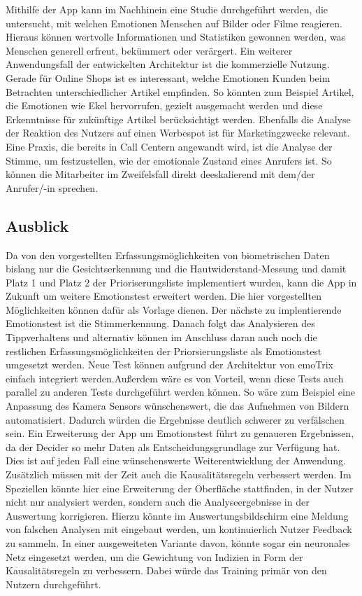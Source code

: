 Mithilfe der App kann im Nachhinein eine Studie durchgeführt werden, die untersucht, mit welchen Emotionen Menschen auf Bilder oder Filme reagieren. Hieraus können wertvolle Informationen und Statistiken gewonnen werden, was Menschen generell erfreut, bekümmert oder verärgert. \newline
Ein weiterer Anwendungsfall der entwickelten Architektur ist die kommerzielle Nutzung. Gerade für Online Shops ist es interessant, welche Emotionen Kunden beim Betrachten unterschiedlicher Artikel empfinden. So könnten zum Beispiel Artikel, die Emotionen wie Ekel hervorrufen, gezielt ausgemacht werden und diese Erkenntnisse für zukünftige Artikel berücksichtigt werden. Ebenfalls die Analyse der Reaktion des Nutzers auf einen Werbespot ist für Marketingzwecke relevant. Eine Praxis, die bereits in Call Centern angewandt wird, ist die Analyse der Stimme, um festzustellen, wie der emotionale Zustand eines Anrufers ist. So können die Mitarbeiter im Zweifelsfall direkt deeskalierend mit dem/der Anrufer/-in sprechen.\newline
\subsection{Ausblick}
Da von den vorgestellten Erfassungsmöglichkeiten von biometrischen Daten bislang nur die Gesichtserkennung und die Hautwiderstand-Messung und damit Platz 1 und Platz 2 der Prioriserungsliste implementiert wurden, kann die App in Zukunft um weitere Emotionstest erweitert werden. Die hier vorgestellten Möglichkeiten können dafür als Vorlage dienen. Der nächste zu implentierende Emotionstest ist die Stimmerkennung. Danach folgt das Analysieren des Tippverhaltens und alternativ können im Anschluss daran auch noch die restlichen Erfassungsmöglichkeiten der Priorsierungsliste als Emotionstest umgesetzt werden. Neue Test können aufgrund der Architektur von emoTrix einfach integriert werden.\newline Außerdem wäre es von Vorteil, wenn diese Tests auch parallel zu anderen Tests durchgeführt werden können. So wäre zum Beispiel eine Anpassung des Kamera Sensors wünschenswert, die das Aufnehmen von Bildern automatisiert. Dadurch würden die Ergebnisse deutlich schwerer zu verfälschen sein.\newline
Ein Erweiterung der App um Emotionstest führt zu genaueren Ergebnissen, da der Decider so mehr Daten als Entscheidungsgrundlage zur Verfügung hat. Dies ist auf jeden Fall eine wünschenswerte Weiterentwicklung der Anwendung.\newline
Zusätzlich müssen mit der Zeit auch die Kausalitätsregeln verbessert werden. Im Speziellen könnte hier eine Erweiterung der Oberfläche stattfinden, in der Nutzer nicht nur analysiert werden, sondern auch die Analyseergebnisse in der Auswertung korrigieren. Hierzu könnte im Auswertungsbildschirm eine Meldung von falschen Analysen mit eingebaut werden, um kontinuierlich Nutzer Feedback zu sammeln. In einer ausgeweiteten Variante davon, könnte sogar ein neuronales Netz eingesetzt werden, um die Gewichtung von Indizien in Form der Kausalitätsregeln zu verbessern. Dabei würde das Training primär von den Nutzern durchgeführt.
